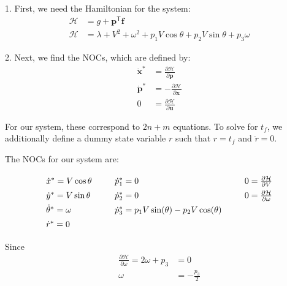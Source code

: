 \documentclass{article}
\begin{document}
\begin{enumerate}[label=(\roman*)]
	1. First, we need the Hamiltonian for the system:
	\begin{equation}
	\begin{aligned}
	\mathcal{H} &= g + \bm p^\mathsf{T} \bm f \\
	\mathcal{H} &= \lambda + V^2 + \omega^2 +
	               p_1 V\cos\theta + p_2 V\sin\theta + p_3 \omega
	\end{aligned}
	\end{equation}
	
	2. Next, we find the NOCs, which are defined by:
	\begin{equation}
	\begin{aligned}
	\dot{\bm{x}}^* &= \frac{\partial \mathcal{H}}{\partial \bm{p}} \\
	\dot{\bm{p}}^* &= -\frac{\partial \mathcal{H}}{\partial \bm{x}} \\
	0 &= \frac{\partial \mathcal{H}}{\partial \bm{u}}
	\end{aligned}
	\end{equation}
	
	For our system, these correspond to $2n+m$ equations. To solve for $t_f$, we additionally define a dummy state variable $r$ such that $r=t_f$ and $\dot r=0$.
	
	The NOCs for our system are:
	
	\begin{equation}
	{\renewcommand{\arraystretch}{1.4}
	\begin{tabular}[c]{l l l l l}
	$\dot x^* = V \cos\theta$ &\;&
	$\dot p_1^* = 0$	&\;&
	$0 = \frac{\partial\mathcal{H}}{\partial V}$ \\
	
	$\dot y^* = V \sin\theta$ &\;&
	$\dot p_2^* = 0$	&\;&
	$0 = \frac{\partial\mathcal{H}}{\partial \omega}$ \\
	
	$\dot \theta^* = \omega$ &\;&
	$\dot p_3^* = p_1V\sin(\theta) - p_2V\cos(\theta)$ \\
	
	$\dot r^* = 0$
	\end{tabular}}
	\end{equation}
	
	Since
	\begin{equation}
	\begin{aligned}
	\frac{\partial\mathcal{H}}{\partial \omega} = 2\omega + p_3 &= 0 \\
	\omega &=-\frac{p_3}{2}
	\end{aligned}
	\end{equation}
	

\end{enumerate}
\end{document}
